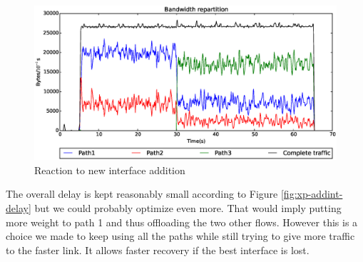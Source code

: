 \begin{figure}[!ht]
\centering
\includegraphics[width=\textwidth]{images/xp/addint_bw.eps}
\caption{Reaction to new interface addition}
\label{fig:xp-addint-bw}
\end{figure}

The overall delay is kept reasonably small according to Figure \ref{fig:xp-addint-delay} but we could probably optimize even more. That would imply putting more weight to path 1 and thus offloading the two other flows. However this is a choice we made to keep using all the paths while still trying to give more traffic to the faster link. It allows faster recovery if the best interface is lost.

